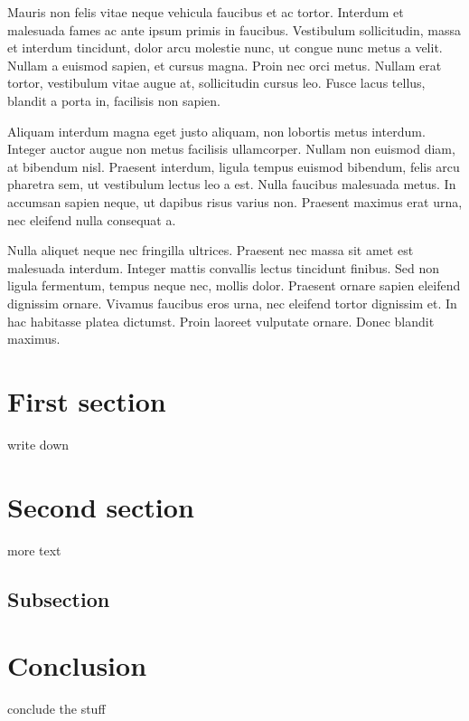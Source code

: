 \documentclass[conference]{IEEEtran}
\begin{document}
Mauris non felis vitae neque vehicula faucibus et ac tortor. Interdum et malesuada fames ac ante ipsum primis in faucibus. Vestibulum sollicitudin, massa et interdum tincidunt, dolor arcu molestie nunc, ut congue nunc metus a velit. Nullam a euismod sapien, et cursus magna. Proin nec orci metus. Nullam erat tortor, vestibulum vitae augue at, sollicitudin cursus leo. Fusce lacus tellus, blandit a porta in, facilisis non sapien.

Aliquam interdum magna eget justo aliquam, non lobortis metus interdum. Integer auctor augue non metus facilisis ullamcorper. Nullam non euismod diam, at bibendum nisl. Praesent interdum, ligula tempus euismod bibendum, felis arcu pharetra sem, ut vestibulum lectus leo a est. Nulla faucibus malesuada metus. In accumsan sapien neque, ut dapibus risus varius non. Praesent maximus erat urna, nec eleifend nulla consequat a.

Nulla aliquet neque nec fringilla ultrices. Praesent nec massa sit amet est malesuada interdum. Integer mattis convallis lectus tincidunt finibus. Sed non ligula fermentum, tempus neque nec, mollis dolor. Praesent ornare sapien eleifend dignissim ornare. Vivamus faucibus eros urna, nec eleifend tortor dignissim et. In hac habitasse platea dictumst. Proin laoreet vulputate ornare. Donec blandit maximus.

\section{First section} %
\label{sec:name1}
write down

\section{Second section} %
\label{sec:name2}
more text

\subsection{Subsection}
\label{sec:name21}

\section{Conclusion} %
conclude the stuff



\end{document}
